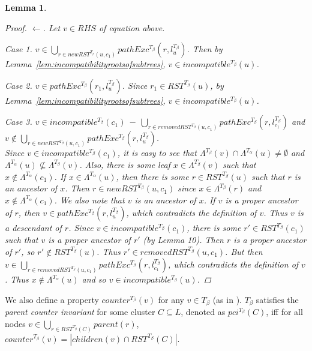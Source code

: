 \documentclass{article}
\newcommand{\leafset}{\Lambda}
\newcommand{\TA}{T_\alpha}
\newcommand{\TB}{T_\beta}
\newtheorem{incompatibilityrecursive}[incompatibility]{Lemma}
\begin{document}
\begin{incompatibilityrecursive}
\begin{proof}
            $\longleftarrow$. Let $v \in RHS$ of equation above.

            \textit{Case 1.} $v \in \bigcup_{r \in newRST^{\TB}(u, c_1)} pathExc^{\TB}(r, l_u^{\TB})$. Then by Lemma~\ref{lem:incompatibilityrootsofsubtrees}, $v \in incompatible^{\TB}(u)$.

            \textit{Case 2.} $v \in pathExc^{\TB}(r_1, l_u^{\TB})$. Since $r_1 \in RST^{\TB}(u)$, by Lemma~\ref{lem:incompatibilityrootsofsubtrees}, $v \in incompatible^{\TB}(u)$.

            \textit{Case 3.} $v \in incompatible^{\TB}(c_1)\ -\ \bigcup_{r \in removedRST^{\TB}(u, c_1)} pathExc^{\TB}(r, l_{c_1}^{\TB})$ and\\[0.25em] %
            $v \not\in \bigcup_{r \in newRST^{\TB}(u, c_1)} pathExc^{\TB}(r, l_u^{\TB})$.\\[0.25em]
            Since $v \in incompatible^{\TB}(c_1)$, it is easy to see that $\leafset^{\TB}(v) \cap \leafset^{\TA}(u) \neq \emptyset$ and $\leafset^{\TA}(u) \not\subseteq \leafset^{\TB}(v)$. Also, there is some leaf $x \in \leafset^{\TB}(v)$ such that $x \not\in \leafset^{\TA}(c_1)$. If $x \in \leafset^{\TA}(u)$, then there is some $r \in RST^{\TB}(u)$ such that $r$ is an ancestor of $x$. Then $r \in newRST^{\TB}(u, c_1)$ since $x \in \leafset^{\TB}(r)$ and $x \not\in \leafset^{\TA}(c_1)$. We also note that $v$ is an ancestor of $x$. If $v$ is a proper ancestor of $r$, then $v \in pathExc^{\TB}(r, l_u^{\TB})$, which contradicts the definition of $v$. Thus $v$ is a descendant of $r$. Since $v \in incompatible^{\TB}(c_1)$, there is some $r' \in RST^{\TB}(c_1)$ such that $v$ is a proper ancestor of $r'$ (by Lemma 10). Then $r$ is a proper ancestor of $r'$, so $r' \not\in RST^{\TB}(u)$. Thus $r' \in removedRST^{\TB}(u, c_1)$. But then $v \in \bigcup_{r \in removedRST^{\TB}(u, c_1)} pathExc^{\TB}(r, l_{c_1}^{\TB})$, which contradicts the definition of $v$. Thus $x \not\in \leafset^{\TA}(u)$ and so $v \in incompatible^{\TB}(u)$.
        \end{proof}
    \end{incompatibilityrecursive}

    We also define a property $counter^{\TB}(v)$ for any $v \in \TB$ (as in \cite{jansson2018algorithms}). $\TB$ satisfies the \textit{parent counter invariant} for some cluster $C \subseteq L$, denoted as $pci^{\TB}(C)$, iff for all nodes $v \in \bigcup_{r \in RST^{\TB}(C)} parent(r)$, $counter^{\TB}(v) = |children(v) \cap RST^{\TB}(C)|$.
\end{document}
